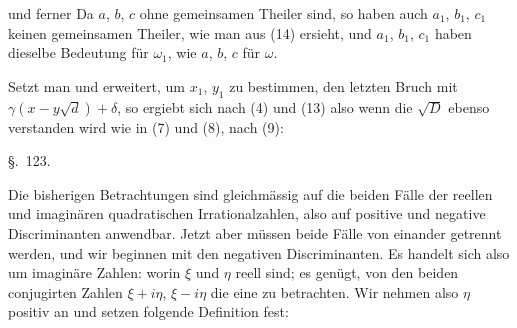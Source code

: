 und ferner
Da $a$, $b$, $c$ ohne gemeinsamen Theiler sind, so haben auch $a_1$, $b_1$, $c_1$ keinen gemeinsamen Theiler, wie man aus (14) ersieht, und $a_1$, $b_1$, $c_1$ haben dieselbe Bedeutung f\"ur $\omega_1$, wie $a$, $b$, $c$ f\"ur $\omega$.


Setzt man
und erweitert, um $x_1$, $y_1$ zu bestimmen, den letzten Bruch mit $\gamma(x-y\sqrt{d})+\delta$, so ergiebt sich nach (4) und (13)
also wenn die $\sqrt{D}$ ebenso verstanden wird wie in (7) und (8), nach (9):

\begin{center}
\S.\ 123.

\end{center}

Die bisherigen Betrachtungen sind gleichm\"assig auf die beiden F\"alle der reellen und imagin\"aren quadratischen Irrationalzahlen, also auf positive und negative Discriminanten anwendbar. Jetzt aber m\"ussen beide F\"alle von einander getrennt werden, und wir beginnen mit den negativen Discriminanten. Es handelt sich also um imagin\"are Zahlen:
worin $\xi$ und $\eta$ reell sind; es gen\"ugt, von den beiden conjugirten Zahlen $\xi+i\eta$, $\xi-i\eta$ die eine zu betrachten. Wir nehmen also $\eta$ positiv an und setzen folgende Definition fest:

